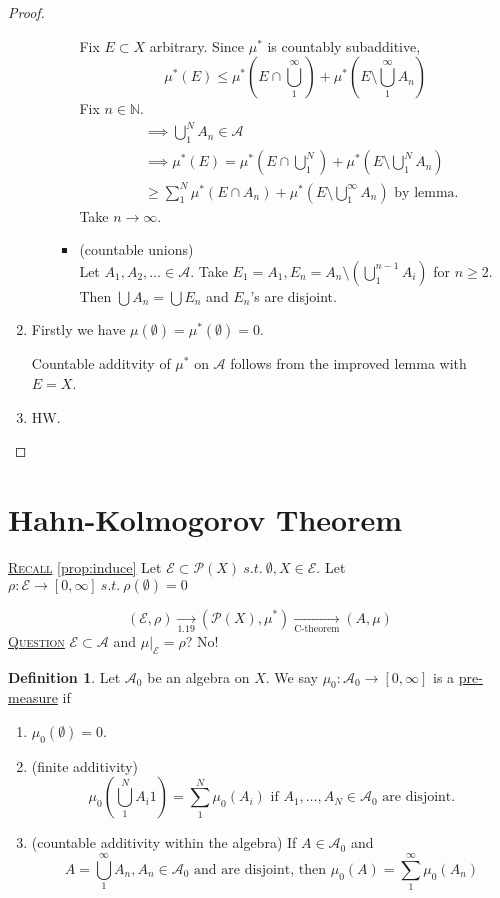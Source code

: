 \documentclass{report}
\newcommand{\N}{\mathbb{N}}
\newcommand{\st}{\ s.t.\ }
\newcommand{\fancyem}[1]{\underline{\textsc{#1}}}
\theoremstyle{definition}
\newtheorem{definition}[theorem]{Definition}
\theoremstyle{remark}
\begin{document}
\begin{proof}
\begin{enumerate}
\begin{enumerate}
\begin{itemize}
		Fix $E \subset X$ arbitrary.
		Since $\mu^*$ is countably subadditive, 
		\[
		\mu^*(E) \leq \mu^*\left(E \cap \bigcup_1^\infty\right) + \mu^*\left(E \setminus \bigcup_1^\infty A_n\right)
		\]
		Fix $n \in \N.$
		\begin{align*}
		& \implies \bigcup_1^N A_n \in \mathcal{A} \\
		& \implies \mu^*(E) = \mu^*\left(E \cap \bigcup_1^N\right) + \mu^*\left(E \setminus \bigcup_1^N A_n\right) \\
		& \geq \sum_{1}^N \mu^*(E \cap A_n) + \mu^*\left(E \setminus \bigcup_1^\infty A_n\right) \text{ by lemma}.
		\end{align*}
		Take $n \to \infty.$
		\item
		(countable unions)\\
		Let $A_1, A_2, \ldots \in \mathcal{A}.$ Take $E_1 = A_1, E_n = A_n \setminus \left(\bigcup_1^{n-1} A_i\right)$ for $n \geq 2.$ Then $\bigcup A_n = \bigcup E_n$ and $E_n$'s are disjoint.
		\end{itemize}
	\end{enumerate}
	\item
	Firstly we have $\mu(\emptyset) = \mu^*(\emptyset) = 0.$
	
	Countable additvity of $\mu^*$ on $\mathcal{A}$ follows from the improved lemma with $E = X$.	
	
	\item
	HW. \qedhere
\end{enumerate}
\end{proof}

\section{Hahn-Kolmogorov Theorem}
\fancyem{Recall} \ref{prop:induce} Let $\mathcal{E} \subset \mathcal{P}(X) \st \emptyset, X \in \mathcal{E}.$ Let $\rho: \mathcal{E} \to [0, \infty] \st \rho(\emptyset) = 0$

\[
(\mathcal{E}, \rho) \xrightarrow[1.19]{} (\mathcal{P}(X), \mu^*) \xrightarrow[\text{C-theorem}]{} (A, \mu)
\] 
\fancyem{Question} $\mathcal{E} \subset \mathcal{A}$ and $\mu|_\mathcal{E} = \rho$? No!
\begin{definition}
Let $\mathcal{A}_0$ be an algebra on $X$. We say $\mu_0: \mathcal{A}_0 \to [0, \infty]$ is a \underline{pre-measure} if 
\begin{enumerate}
\item $\mu_0(\emptyset) = 0.$
\item (finite additivity)
\[
\mu_0\left(\bigcup_1^N A_i1\right) = \sum_1^N \mu_0(A_i) \text{ if } A_1, \ldots, A_N \in \mathcal{A}_0 \text{ are disjoint.}
\]
\item (countable additivity within the algebra) If $A \in \mathcal{A}_0$ and 
\[
A = \bigcup_1^\infty A_n, A_n \in \mathcal{A}_0 \text{ and are disjoint, then } \mu_0(A) = \sum_1^\infty \mu_0(A_n)
\]
\end{enumerate}
\end{definition}
\end{document}
